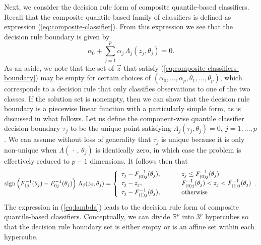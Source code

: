 
Next, we consider the decision rule form of composite quantile-based
classifiers.  Recall that the composite quantile-based family of classifiers is
defined as expression (\ref{eq:composite-classifier}).  From this expression we
see that the decision rule boundary is given by
\begin{equation}
  \label{eq:composite-classifiers-boundary}
  \alpha_0 + \sum_{j=1}^p \alpha_j\, \Lambda_j (z_j, \theta_j) = 0.
\end{equation}
As an aside, we note that the set of $\vec{z}$ that satisfy
(\ref{eq:composite-classifiers-boundary}) may be empty for certain choices of
$(\alpha_0, \dots, \alpha_p, \allowbreak\theta_1, \allowbreak\dots, \allowbreak\theta_p)$, which corresponds to a
decision rule that only classifies observations to one of the two classes.  If
the solution set is nonempty, then we can show that the decision rule boundary
is a piecewise linear function with a particularly simple form, as is discussed
in what follows.  Let us define the component-wise quantile classifier decision
boundary $\tau_j$ to be the unique point satisfying
$\Lambda_j (\tau_j, \theta_j) = 0,~ j = 1, \dots, p$.  We can assume without
loss of generality that $\tau_j$ is unique because it is only non-unique when
$\Lambda(\,\cdot\,,\, \theta_j)$ is identically zero, in which case the problem
is effectively reduced to $p - 1$ dimensions.  It follows then that
\begin{equation}
  \label{eq:lambda}
  \operatorname{sign}\Big(F_{1j}^{-1}(\theta_j) - F_{0j}^{-1}(\theta_j)\Big)~ \Lambda_j(z_j, \theta_j) =
  \left\{
    \begin{array}{lll}
      \tau_j - F_{(0)j}^{-1}(\theta_j),
      & \hspace{5mm}
      & z_j \leq F_{(0)j}^{-1}(\theta_j) \\[0.5ex]
      \tau_j - z_j,
      & \hspace{5mm}
      & F_{(0)j}^{-1}(\theta_j) < z_j < F_{(1)j}^{-1}(\theta_j) \\[0.5ex]
      \tau_j - F_{(1)j}^{-1} (\theta_j),
      & \hspace{5mm}
      & \text{otherwise} \\
    \end{array}.
  \right.
\end{equation}
The expression in (\ref{eq:lambda}) leads to the decision rule form of composite
quantile-based classifiers.  Conceptually, we can divide $\mathbb{R}^p$ into
$3^p$ hypercubes so that the decision rule boundary set is either empty or is an
affine set within each hypercube.



